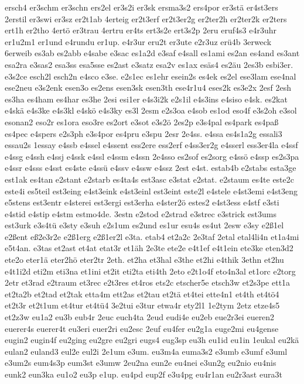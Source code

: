 {ersch4
er3schm
er3schn
ers2el
er3s2i
er3sk
ersma3s2
ers4por
er3stä
er4st3ers
2erstil
er3swi
er3sz
er2t1ab
4erteig
er2t3erf
er2t3er2g
er2ter2h
er2ter2k
er2ters
ert1h
er2tho
4ertö
er3trau
4ertru
er4ts
ert3s2e
ert3s2p
2eru
eruf4s3
e4r3uhr
er1u2m1
er1und
e4rundu
er1up.
e4r3ur
eru2t
er3ute
e2r3uz
erü4b
3erweck
6erweib
es3ab
es2abb
e4sabe
e3sac
es1a2d
e3saf
e4sall
es1ami
es2an
es4and
es3ant
esa2ra
e3sas2
esa3ss
esa5sse
es2ast
e3satz
esa2v
es1ax
esäs4
es2äu
2es3b
esbi3er.
e3s2ce
esch2l
esch2n
e4sco
e3se.
e2s1ec
es1ehr
esein2s
es4ek
es2el
ese3lam
ese4nal
ese2neu
e3s2enk
esen3o
es2ens
esen3sk
esen3th
ese4r1u4
eses2k
es3e2x
2esf
2esh
es3ha
es4ham
es4har
es3he
2esi
esi1er
e4s3i2k
e2s1il
e4s3ins
e4siso
e4sk.
es2kat
e4skä
e4s3ke
e4s3kl
e4skö
e4s3ky
es3l
2esm
e2s3oa
e4sob
es1od
eso4f
e3s2oh
e3sol
esonan2
eso2r
es1ora
eso3re
es2ort
e3sot
e3s2ö
2es2p
e3s4pal
es4park
es4paß
es4pec
e4spers
e2s3ph
e3s4por
es4pru
e3spu
2esr
2e4ss.
e4ssa
es4s1a2g
essali3
essau2s
1essay
e4ssb
e4ssel
e4ssent
ess2ere
ess2erf
e4ss3er2g
e4sserl
ess3er4la
e4ssf
e4ssg
e4ssh
e4ssj
e4ssk
e4ssl
e4ssm
e4ssn
2e4sso
es2sof
es2sorg
e4ssö
e4ssp
es2s3pa
e4ssr
e4sss
e4sst
es4ste
e4ssü
e4ssv
e4ssw
e4ssz
2est
e4st.
estab4b
e2stabs
esta3ge
est1ak
es4tan
e2stant
e2starb
es4ta4s
est3asc
e3stat
e2stat.
e2staum
es4te
este2c
este4i
es5teil
est3eing
e4st3eink
e4st3einl
est3eint
este2l
e4stele
e4st3emi
e4st3eng
e5stens
est3entr
e4sterei
est3ergi
est3erha
e4ster2ö
estes2
e4st3ess
e4stf
e3sti
e4stid
e4stip
e4stm
estmo4de.
3estn
e2stod
e2strad
e3strec
e3strick
est3ums
est3urk
e3s4tü
e3sty
e3suh
e2s1um
es2und
es1ur
esu4s
es4ut
2esw
e3sy
e2ß1el
e2ßent
eß2e3r2e
e2ß1erg
e2ß1er2l
e3ta.
etab4
et2a2c
2e3taf
2etal
etal4li4n
et1a4mi
e5t4an.
e3tas
et2ast
et4at
etat3r
et1äh
2e3te
ete2e
e4t1ef
e4t1ein
ete3ke
eten3d2
ete2o
eter1ä
eter2hö
eter2tr
2eth.
et2ha
et3hal
e3the
et2hi
e4thik
3ethn
et2hu
e4t1i2d
eti2m
eti3na
et1ini
et2it
eti2ta
eti4th
2eto
e2t1o4f
eto4n3al
et1orc
e2torg
2etr
et3rad
e2traum
et3rec
e2t3res
et4ros
ets2c
etscher5e
etsch3w
et2s3pe
ett1a
et2ta2b
et2tad
et2tak
etta4m
ett2as
et2tau
et2tä
et4tei
ette4n1
et4th
et4tö4
et2t3r
et2t1um
et4tur
et4tü4
3e2tui
e3tur
etwa4r
ety2l1
1e2tym
2etz
etze4s5
et2z3w
eu1a2
eu3b
eub4r
2euc
euch4ta
2eud
eudi4e
eu2eb
eue2r3ei
eueren2
euerer4s
euerer4t
eu3eri
euer2ri
eu2esc
2euf
eu4fer
eu2g1a
euge2mi
eu4gense
eugin2
eugin4f
eu2ging
eu2gre
eu2gri
eugs4
eug3sp
eu3h
eu1id
eu1in
1eukal
eu2kä
eulan2
euland3
eul2e
eul2i
2e1um
e3um.
eu3m4a
euma3s2
e3umb
e3umf
e3uml
e3um2s
eum4s3p
eum3st
e3umw
2eu2na
eun2e
eu4nei
e3un2g
eu2nio
eu4nis
eunk2
eun3ka
eu1o2
eu3p
e1up.
eu4pd
eup2f
e3u4pg
eu4r1an
eu2r3ast
eura3t
}
